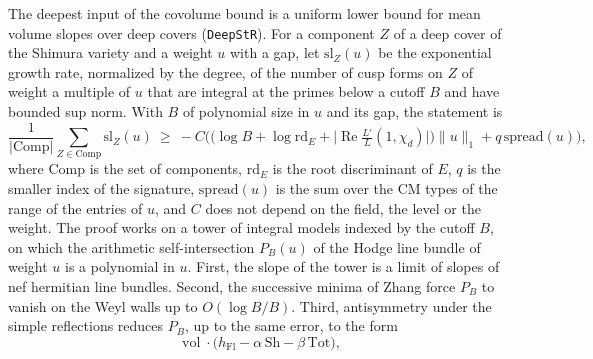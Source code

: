 \documentclass[11pt,letterpaper]{article}
\numberwithin{equation}{section}
\begin{document}
The deepest input of the covolume bound is a uniform lower bound for mean volume slopes over deep covers (\texttt{DeepStR}). For a component $Z$ of a deep cover of the Shimura variety and a weight $u$ with a gap, let $\mathrm{sl}_Z(u)$ be the exponential growth rate, normalized by the degree, of the number of cusp forms on $Z$ of weight a multiple of $u$ that are integral at the primes below a cutoff $B$ and have bounded sup norm. With $B$ of polynomial size in $u$ and its gap, the statement is
\[
\frac1{\lvert\mathrm{Comp}\rvert}\sum_{Z\in\mathrm{Comp}}\mathrm{sl}_Z(u)\ \ge\ -C\Big(\big(\log B+\log\mathrm{rd}_E+\big\lvert\operatorname{Re}\tfrac{L'}{L}(1,\chi_d)\big\rvert\big)\lVert u\rVert_1+q\,\mathrm{spread}(u)\Big),
\]
where $\mathrm{Comp}$ is the set of components, $\mathrm{rd}_E$ is the root discriminant of $E$, $q$ is the smaller index of the signature, $\mathrm{spread}(u)$ is the sum over the CM types of the range of the entries of $u$, and $C$ does not depend on the field, the level or the weight. The proof works on a tower of integral models indexed by the cutoff $B$, on which the arithmetic self-intersection $P_B(u)$ of the Hodge line bundle of weight $u$ is a polynomial in $u$. First, the slope of the tower is a limit of slopes of nef hermitian line bundles. Second, the successive minima of Zhang force $P_B$ to vanish on the Weyl walls up to $O(\log B/B)$. Third, antisymmetry under the simple reflections reduces $P_B$, up to the same error, to the form
\[
\operatorname{vol}\cdot\big(h_{\mathrm{Fl}}-\alpha\,\mathrm{Sh}-\beta\,\mathrm{Tot}\big),
\]
\end{document}
